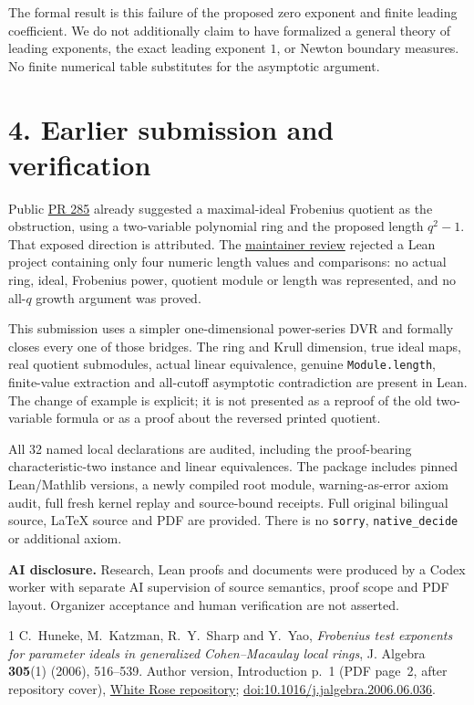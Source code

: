 \documentclass[10pt]{article}
\begin{document}
The formal result is this failure of the proposed zero exponent and finite leading coefficient. We do not additionally claim to have formalized a general theory of leading exponents, the exact leading exponent $1$, or Newton boundary measures. No finite numerical table substitutes for the asymptotic argument.

\section*{4. Earlier submission and verification}
Public \href{https://github.com/The-Last-Math-Competition/The-Last-Math-Competition/pull/285}{PR 285} already suggested a maximal-ideal Frobenius quotient as the obstruction, using a two-variable polynomial ring and the proposed length $q^2-1$. That exposed direction is attributed. The \href{https://github.com/The-Last-Math-Competition/The-Last-Math-Competition/pull/285#issuecomment-5965698008}{maintainer review} rejected a Lean project containing only four numeric length values and comparisons: no actual ring, ideal, Frobenius power, quotient module or length was represented, and no all-$q$ growth argument was proved.

This submission uses a simpler one-dimensional power-series DVR and formally closes every one of those bridges. The ring and Krull dimension, true ideal maps, real quotient submodules, actual linear equivalence, genuine \texttt{Module.length}, finite-value extraction and all-cutoff asymptotic contradiction are present in Lean. The change of example is explicit; it is not presented as a reproof of the old two-variable formula or as a proof about the reversed printed quotient.

All 32 named local declarations are audited, including the proof-bearing characteristic-two instance and linear equivalences. The package includes pinned Lean/Mathlib versions, a newly compiled root module, warning-as-error axiom audit, full fresh kernel replay and source-bound receipts. Full original bilingual source, LaTeX source and PDF are provided. There is no \texttt{sorry}, \texttt{native\_decide} or additional axiom.

\textbf{AI disclosure.} Research, Lean proofs and documents were produced by a Codex worker with separate AI supervision of source semantics, proof scope and PDF layout. Organizer acceptance and human verification are not asserted.

\begin{thebibliography}{1}
 C.~Huneke, M.~Katzman, R.~Y.~Sharp and Y.~Yao, \emph{Frobenius test exponents for parameter ideals in generalized Cohen--Macaulay local rings}, J. Algebra \textbf{305}(1) (2006), 516--539. Author version, Introduction p.~1 (PDF page~2, after repository cover), \href{https://eprints.whiterose.ac.uk/id/eprint/10176/1/Katzman5.pdf}{White Rose repository}; \href{https://doi.org/10.1016/j.jalgebra.2006.06.036}{doi:10.1016/j.jalgebra.2006.06.036}.
\end{thebibliography}
\end{document}
